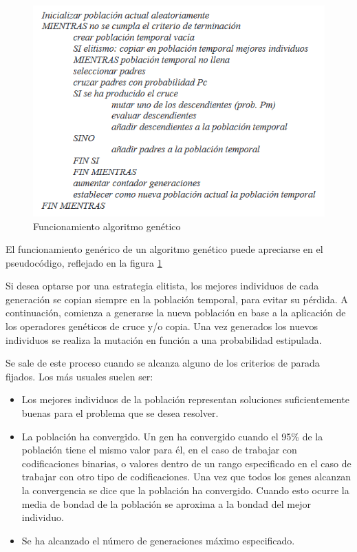 \begin{figure}[h]
    \centering
    \includegraphics[width=.8\textwidth]{images/pseudocodigo.png}
    \caption{Funcionamiento algoritmo genético}
    \label{fig:img14}
\end{figure}

El funcionamiento genérico de un algoritmo genético puede apreciarse
en el pseudocódigo, reflejado en la figura \ref{fig:img14}

Si desea optarse por una estrategia elitista, los mejores individuos de cada
generación se copian siempre en la población temporal, para evitar su pérdida.
A continuación, comienza a generarse la nueva población en base a la aplicación de los operadores genéticos de cruce y/o copia. Una vez generados los nuevos individuos se realiza la mutación en función a una probabilidad estipulada. 

Se sale de este proceso cuando se alcanza alguno de los criterios de parada fijados. Los más usuales suelen ser:
\begin{itemize}
\item Los mejores individuos de la población representan soluciones suficientemente buenas para el problema que se desea resolver.
\item La población ha convergido. Un gen ha convergido cuando el 95\% de la población tiene el mismo valor para él, en el caso de trabajar con codificaciones binarias, o valores dentro de un rango especificado en el caso de trabajar con otro tipo de codificaciones. Una vez que todos los genes alcanzan la convergencia se dice que la población ha convergido. Cuando esto ocurre la media de bondad de la población se aproxima a la bondad del mejor individuo.
\item Se ha alcanzado el número de generaciones máximo especificado.
\end{itemize}

